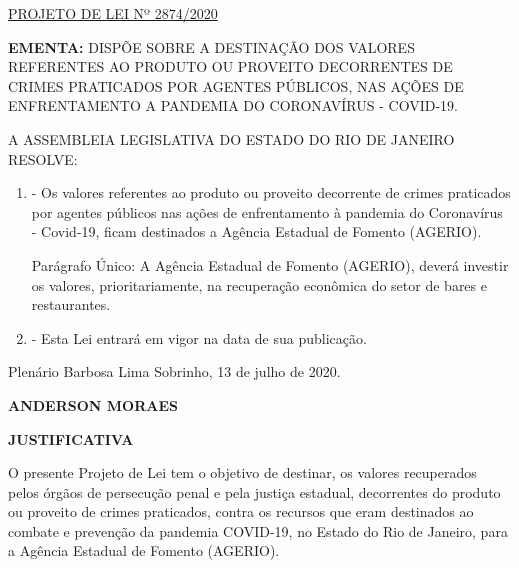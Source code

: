 \documentclass[10pt]{article}
\date{}
\begin{document}
\maketitle
\begin{center}
  \huge
  \vspace{-3cm}\href{http://alerjln1.alerj.rj.gov.br/scpro1923.nsf/f4b46b3cdbba990083256cc900746cf6/30bdb3a66f639899032585a4006ece35?OpenDocument}{PROJETO DE LEI Nº 2874/2020}
\bigskip
\bigskip
\bigskip
  
\end{center}

\textbf{EMENTA:} 
DISPÕE SOBRE A DESTINAÇÃO DOS VALORES REFERENTES AO PRODUTO OU PROVEITO DECORRENTES DE CRIMES PRATICADOS POR AGENTES PÚBLICOS, NAS AÇÕES DE ENFRENTAMENTO A PANDEMIA DO CORONAVÍRUS - COVID-19.








\bigskip

\noindent
A ASSEMBLEIA LEGISLATIVA DO ESTADO DO RIO DE JANEIRO RESOLVE:

\begin{enumerate}[label=Art. \arabic*\textdegree]
\item - Os valores referentes ao produto ou proveito decorrente de crimes praticados por agentes públicos nas ações de enfrentamento à pandemia do Coronavírus - Covid-19, ficam destinados a Agência Estadual de Fomento (AGERIO).

Parágrafo Único: A Agência Estadual de Fomento (AGERIO), deverá investir os valores, prioritariamente, na recuperação econômica do setor de bares e restaurantes.


\item - Esta Lei entrará em vigor na data de sua publicação.


\end{enumerate}




\begin{center}
  Plenário Barbosa Lima Sobrinho, 13 de julho de 2020.

   \bigskip

  \textbf{ ANDERSON MORAES}

  \bigskip

  \textbf{JUSTIFICATIVA}
  \bigskip

\end{center}

  O presente Projeto de Lei tem o objetivo de destinar, os valores recuperados pelos órgãos de persecução penal e pela justiça estadual, decorrentes do produto ou proveito de crimes praticados, contra os recursos que eram destinados ao combate e prevenção da pandemia COVID-19, no Estado do Rio de Janeiro, para a Agência Estadual de Fomento (AGERIO).
\end{document}
